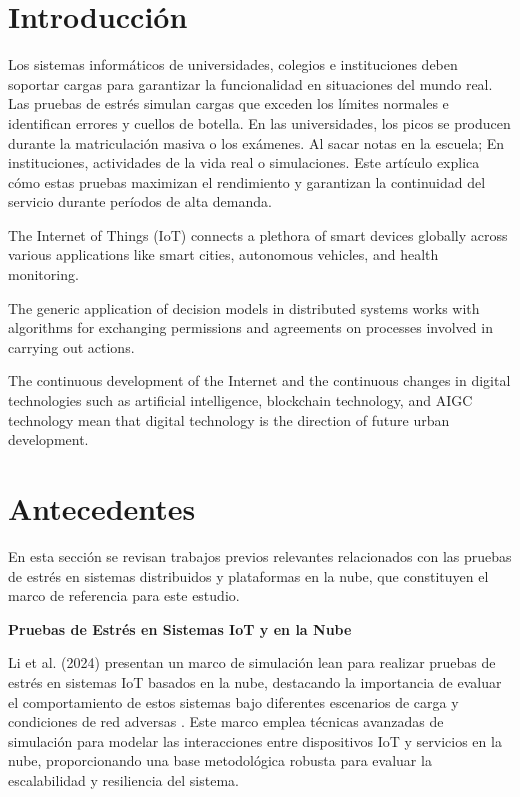 \documentclass{article}
\begin{document}
\section{Introducción}
Los sistemas informáticos de universidades, colegios e instituciones deben soportar cargas para garantizar la funcionalidad en situaciones del mundo real. Las pruebas de estrés simulan cargas que exceden los límites normales e identifican errores y cuellos de botella. En las universidades, los picos se producen durante la matriculación masiva o los exámenes. Al sacar notas en la escuela; En instituciones, actividades de la vida real o simulaciones. Este artículo explica cómo estas pruebas maximizan el rendimiento y garantizan la continuidad del servicio durante períodos de alta demanda.

The Internet of Things (IoT) connects a plethora of smart devices globally across various applications like smart cities, autonomous vehicles, and health monitoring. \parencite{Li20241827}

The generic application of decision models in distributed systems works with algorithms for exchanging permissions and agreements on processes involved in carrying out actions. \parencite{Martínez2021343}

The continuous development of the Internet and the continuous changes in digital technologies such as artificial intelligence, blockchain technology, and AIGC technology mean that digital technology is the direction of future urban development. \parencite{Rao20241026}

\section{Antecedentes}

En esta sección se revisan trabajos previos relevantes relacionados con las pruebas de estrés en sistemas distribuidos y plataformas en la nube, que constituyen el marco de referencia para este estudio.

\textbf{Pruebas de Estrés en Sistemas IoT y en la Nube}

Li et al. (2024) presentan un marco de simulación lean para realizar pruebas de estrés en sistemas IoT basados en la nube, destacando la importancia de evaluar el comportamiento de estos sistemas bajo diferentes escenarios de carga y condiciones de red adversas \cite{Li20241827}. Este marco emplea técnicas avanzadas de simulación para modelar las interacciones entre dispositivos IoT y servicios en la nube, proporcionando una base metodológica robusta para evaluar la escalabilidad y resiliencia del sistema.
\end{document}
